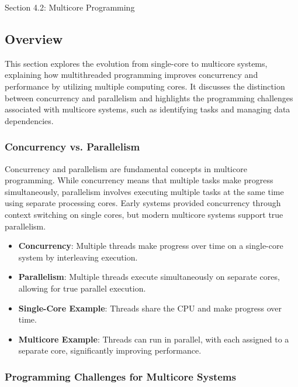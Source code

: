 \begin{notes}{Section 4.2: Multicore Programming}
    \subsection*{Overview}

    This section explores the evolution from single-core to multicore systems, explaining how multithreaded programming improves concurrency and performance by utilizing multiple computing cores. It 
    discusses the distinction between concurrency and parallelism and highlights the programming challenges associated with multicore systems, such as identifying tasks and managing data dependencies.
    
    \subsubsection*{Concurrency vs. Parallelism}
    
    Concurrency and parallelism are fundamental concepts in multicore programming. While concurrency means that multiple tasks make progress simultaneously, parallelism involves executing multiple 
    tasks at the same time using separate processing cores. Early systems provided concurrency through context switching on single cores, but modern multicore systems support true parallelism.
    
    \begin{highlight}
    
        \begin{itemize}
            \item \textbf{Concurrency}: Multiple threads make progress over time on a single-core system by interleaving execution.
            \item \textbf{Parallelism}: Multiple threads execute simultaneously on separate cores, allowing for true parallel execution.
            \item \textbf{Single-Core Example}: Threads share the CPU and make progress over time.
            \item \textbf{Multicore Example}: Threads can run in parallel, with each assigned to a separate core, significantly improving performance.
        \end{itemize}
    
    \end{highlight}
    
    \subsubsection*{Programming Challenges for Multicore Systems}
    

\end{notes}
